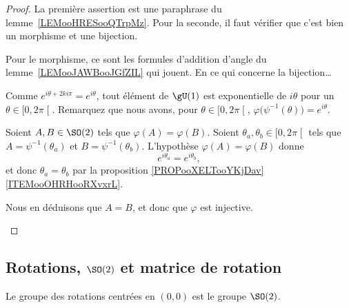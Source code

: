 \begin{proof}
	La première assertion est une paraphrase du lemme~\ref{LEMooHRESooQTrpMz}. Pour la seconde, il faut vérifier que c'est bien un morphisme et une bijection.

	Pour le morphisme, ce sont les formules d'addition d'angle du lemme~\ref{LEMooJAWBooJGfZIL} qui jouent. En ce qui concerne la bijection\ldots

	\begin{subproof}
		\spitem[Surjection]
		Comme \( e^{i\theta+2ki\pi}= e^{i\theta}\), tout élément de \( \gU(1)\) est exponentielle de \( i\theta\) pour un \( \theta\in\mathopen[ 0 , 2\pi \mathclose[\).
		\spitem[Injection]
		Remarquez que nous avons, pour \( \theta\in\mathopen[ 0 , 2\pi \mathclose[\), \( \varphi\big( \psi^{-1}(\theta) \big)= e^{i\theta}\).

		Soient \( A,B\in \SO(2)\) tels que \( \varphi(A)=\varphi(B)\). Soient \( \theta_a,\theta_b\in\mathopen[ 0 , 2\pi \mathclose[\) tels que \( A=\psi^{-1}(\theta_a)\) et \( B=\psi^{-1}(\theta_b)\). L'hypothèse \( \varphi(A)=\varphi(B)\) donne
		\begin{equation}
			e^{i\theta_a}= e^{i\theta_b},
		\end{equation}
		et donc \( \theta_a=\theta_b\) par la proposition \ref{PROPooXELTooYKjDav}\ref{ITEMooOHRHooRXvxrL}.

		Nous en déduisons que \( A=B\), et donc que \( \varphi\) est injective.
	\end{subproof}
\end{proof}

\subsection{Rotations, \( \SO(2)\) et matrice de rotation}

\begin{corollary} \label{CORooVYUJooDbkIFY}
	Le groupe des rotations centrées en \( (0,0)\) est le groupe \( \SO(2)\).
\end{corollary}

